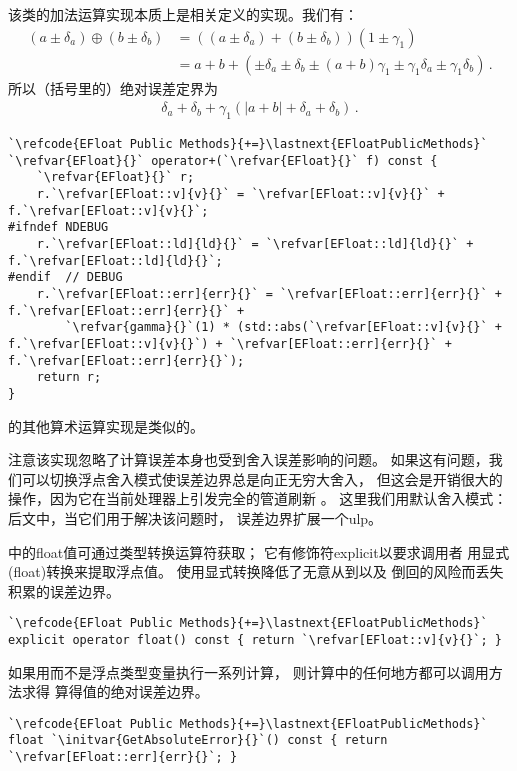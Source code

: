 该类的加法运算实现本质上是相关定义的实现。我们有：
\begin{align*}
    (a\pm\delta_a)\oplus(b\pm\delta_b) & =((a\pm\delta_a)+(b\pm\delta_b))(1\pm\gamma_1)                                          \\
                                       & =a+b+(\pm\delta_a\pm\delta_b\pm(a+b)\gamma_1\pm\gamma_1\delta_a\pm\gamma_1\delta_b)\, .
\end{align*}
所以（括号里的）绝对误差定界为
\begin{align*}
    \delta_a+\delta_b+\gamma_1(|a+b|+\delta_a+\delta_b)\, .
\end{align*}
\begin{lstlisting}
`\refcode{EFloat Public Methods}{+=}\lastnext{EFloatPublicMethods}` 
`\refvar{EFloat}{}` operator+(`\refvar{EFloat}{}` f) const {
    `\refvar{EFloat}{}` r;
    r.`\refvar[EFloat::v]{v}{}` = `\refvar[EFloat::v]{v}{}` + f.`\refvar[EFloat::v]{v}{}`;
#ifndef NDEBUG
    r.`\refvar[EFloat::ld]{ld}{}` = `\refvar[EFloat::ld]{ld}{}` + f.`\refvar[EFloat::ld]{ld}{}`;
#endif  // DEBUG
    r.`\refvar[EFloat::err]{err}{}` = `\refvar[EFloat::err]{err}{}` + f.`\refvar[EFloat::err]{err}{}` +
        `\refvar{gamma}{}`(1) * (std::abs(`\refvar[EFloat::v]{v}{}` + f.`\refvar[EFloat::v]{v}{}`) + `\refvar[EFloat::err]{err}{}` + f.`\refvar[EFloat::err]{err}{}`);
    return r;
}
\end{lstlisting}

的其他算术运算实现是类似的。

注意该实现忽略了计算误差本身也受到舍入误差影响的问题。
如果这有问题，我们可以切换浮点舍入模式使误差边界总是向正无穷大舍入，
但这会是开销很大的操作，因为它在当前处理器上引发完全的管道刷新
。
这里我们用默认舍入模式：后文中，当它们用于解决该问题时，
误差边界扩展一个ulp。

中的{\ttfamily float}值可通过类型转换运算符获取；
它有修饰符{\ttfamily explicit}以要求调用者
用显式{\ttfamily (float)}转换来提取浮点值。
使用显式转换降低了无意从到以及
倒回的风险而丢失积累的误差边界。
\begin{lstlisting}
`\refcode{EFloat Public Methods}{+=}\lastnext{EFloatPublicMethods}`
explicit operator float() const { return `\refvar[EFloat::v]{v}{}`; }
\end{lstlisting}

如果用而不是浮点类型变量执行一系列计算，
则计算中的任何地方都可以调用方法求得
算得值的绝对误差边界。
\begin{lstlisting}
`\refcode{EFloat Public Methods}{+=}\lastnext{EFloatPublicMethods}`
float `\initvar{GetAbsoluteError}{}`() const { return `\refvar[EFloat::err]{err}{}`; }
\end{lstlisting}

